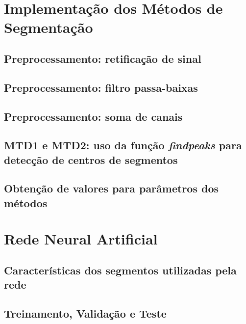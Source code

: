 \section{Implementação dos Métodos de Segmentação}

\subsection{Preprocessamento: retificação de sinal}

\subsection{Preprocessamento: filtro passa-baixas}

\subsection{Preprocessamento: soma de canais}

\subsection{MTD1 e MTD2: uso da função \emph{findpeaks} para detecção de centros de segmentos}

\subsection{Obtenção de valores para parâmetros dos métodos}

\section{Rede Neural Artificial}

\subsection{Características dos segmentos utilizadas pela rede}

\subsection{Treinamento, Validação e Teste}